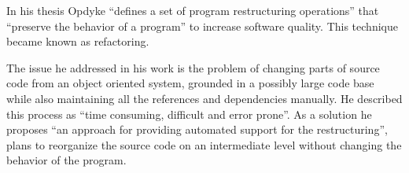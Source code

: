 \documentclass{llncs}
\begin{document}
In his thesis \cite{mast:REFOOF} Opdyke ``defines a set of program restructuring operations'' that ``preserve the behavior of a program'' to increase software quality. This technique became known as refactoring.

The issue he addressed in his work is the problem of changing parts of source code from an object oriented system, grounded in a possibly large code base while also maintaining all the references and dependencies manually. He described this process as ``time consuming, difficult and error prone''. As a solution he proposes ``an approach for providing automated support for the restructuring'', plans to reorganize the source code on an intermediate level without changing the behavior of the program.
 

\newpage


\end{document}
